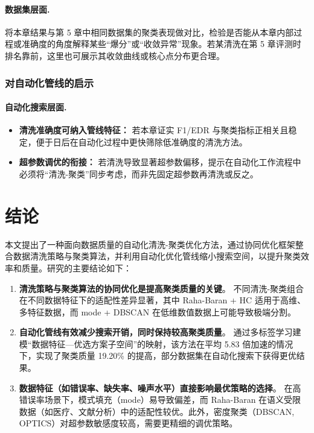 \documentclass[10pt]{article} %
\numberwithin{equation}{section}
\begin{document}
\paragraph{数据集层面.}
将本章结果与第 5 章中相同数据集的聚类表现做对比，检验是否能从本章内部过程或准确度的角度解释某些“爆分”或“收敛异常”现象。若某清洗在第 5 章评测时排名靠前，这里也可展示其收敛曲线或核心点分布更合理。

\subsubsection{对自动化管线的启示}
\label{subsec:discussion_automl}

\paragraph{自动化搜索层面.}
\begin{itemize}
    \item \textbf{清洗准确度可纳入管线特征：}
    若本章证实 F1/EDR 与聚类指标正相关且稳定，便于日后在自动化过程中更快筛除低准确度的清洗方法。
    \item \textbf{超参数调优的衔接：}
    若清洗导致显著超参数偏移，提示在自动化工作流程中必须将“清洗-聚类”同步考虑，而非先固定超参数再清洗或反之。
\end{itemize}



\section{结论}
\label{sec:conclusion}

本文提出了一种面向数据质量的自动化清洗-聚类优化方法，通过协同优化框架整合数据清洗策略与聚类算法，并利用自动化优化管线缩小搜索空间，以提升聚类效率和质量。研究的主要结论如下：

\begin{enumerate}
    \item \textbf{清洗策略与聚类算法的协同优化是提高聚类质量的关键}。  
    不同清洗-聚类组合在不同数据特征下的适配性差异显著，其中 Raha-Baran + HC 适用于高维、多特征数据，而 mode + DBSCAN 在低维数值数据上可能导致极端分割。

    \item \textbf{自动化管线有效减少搜索开销，同时保持较高聚类质量}。  
    通过多标签学习建模“数据特征—优选方案子空间”的映射，该方法在平均 5.83 倍加速的情况下，实现了聚类质量 19.20\% 的提高，部分数据集在自动化搜索下获得更优结果。

    \item \textbf{数据特征（如错误率、缺失率、噪声水平）直接影响最优策略的选择}。  
    在高错误率场景下，模式填充（mode）易导致偏差，而 Raha-Baran 在语义受限数据（如医疗、文献分析）中的适配性较优。此外，密度聚类（DBSCAN, OPTICS）对超参数敏感度较高，需要更精细的调优策略。
\end{enumerate}
\end{document}
